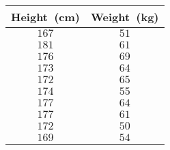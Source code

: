 \begin{tabular}{cc}         \toprule
Height~(cm) & Weight~(kg) \\\midrule
$167$       & $51$        \\[6pt]
$181$       & $61$        \\[6pt]
$176$       & $69$        \\[6pt]
$173$       & $64$        \\[6pt]
$172$       & $65$        \\[6pt]
$174$       & $55$        \\[6pt]
$177$       & $64$        \\[6pt]
$177$       & $61$        \\[6pt]
$172$       & $50$        \\[6pt]
$169$       & $54$        \\\bottomrule
\end{tabular}

